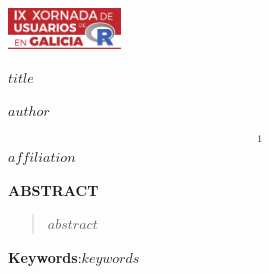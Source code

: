 \begin{flushright}
\includegraphics[angle=0,keepaspectratio,width=3cm]{logo.pdf}
\end{flushright}

 \vspace{20pt}

\begin{center}
\textbf{$title$}

\vspace{0.15cm}

$author$ 
\end{center}

\vspace{0.06cm}

$$^{1}$$ 
$affiliation$
\begin{center}
\textbf{ABSTRACT}
\end{center}

\begin{quotation}
\noindent $abstract$
\end{quotation}

\vspace{0.4cm}

\textbf{Keywords}:$keywords$

\vspace{0.4cm}


